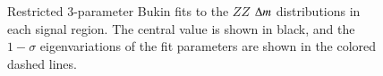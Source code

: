 \begin{figure}[htbp]
{	} \\
	 \\
	\caption{Restricted 3-parameter Bukin fits to the $ZZ$ $\Delta m$ distributions in each signal region. The central value is shown in black, and the $1-\sigma$ eigenvariations of the fit parameters are shown in the colored dashed lines.}
	\label{fig:fit-results-Bukin3Par-ZZ}
\end{figure}

